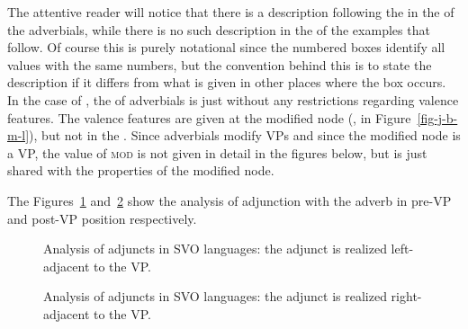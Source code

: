 The attentive reader will notice that there is a description following the  in the \modv of
the adverbials, while there is no such description in the \modvs of the  examples that
follow. Of course this is purely notational since the numbered boxes identify all values with the
same numbers, but the convention behind this is to state the description if it differs from what is
given in other places where the box occurs. In the case of , the \modv of adverbials is just
 without any restrictions regarding valence features. The valence features are given at
the modified node (\eg \spr \eliste, \comps {} in
Figure~\ref{fig-j-b-m-l}), but not in the \modv. Since  adverbials modify VPs and since the
modified node is a VP, the value of \textsc{mod} is not given in detail in the figures below, but is just shared with the
properties of the modified node.


The Figures~\ref{fig-adj-vp} and~\ref{fig-vp-adj} show the analysis of adjunction with the adverb in
pre-VP and post-VP position respectively.
\begin{figure}
\caption{\label{fig-adj-vp}Analysis of adjuncts in SVO languages: the adjunct is realized left-adjacent to the VP.}
\end{figure}
\begin{figure}
\caption{\label{fig-vp-adj}Analysis of adjuncts in SVO languages: the adjunct is realized right-adjacent to the VP.}
\end{figure}

